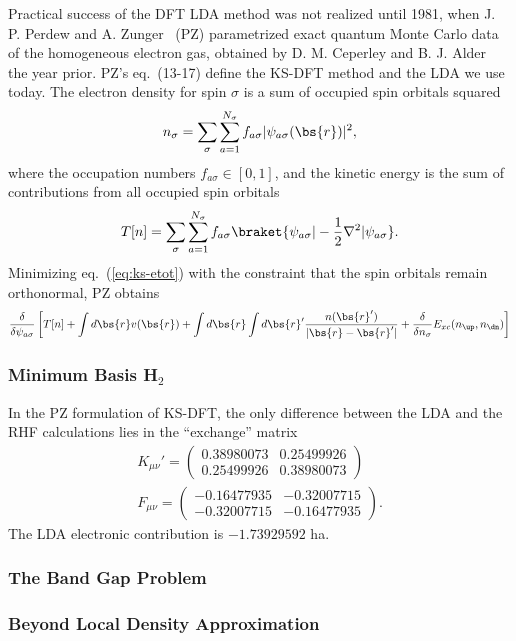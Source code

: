 Practical success of the DFT LDA method was not realized until 1981, when J. P. Perdew and A. Zunger~\cite{Perdew1981} (PZ) parametrized exact quantum Monte Carlo data of the homogeneous electron gas, obtained by D. M. Ceperley and B. J. Alder~\cite{Ceperley1980} the year prior. PZ's eq.~(13-17) define the KS-DFT method and the LDA we use today. The electron density for spin $\sigma$ is a sum of occupied spin orbitals squared
\begin{align}
n_{\sigma} = \sum\limits_{\sigma}\sum\limits_{a=1}^{N_{\sigma}}
f_{a\sigma} \vert\psi_{a\sigma}(\bs{r})\vert^2,
\end{align}
where the occupation numbers $f_{a\sigma}\in[0, 1]$, and the kinetic energy is the sum of contributions from all occupied spin orbitals
\begin{align}
T[n] = \sum\limits_\sigma\sum\limits_{a=1}^{N_{\sigma}}
f_{a\sigma} \braket{\psi_{a\sigma}|-\frac{1}{2}\nabla^2|\psi_{a\sigma}}.
\end{align}
Minimizing eq.~(\ref{eq:ks-etot}) with the constraint that the spin orbitals remain orthonormal, PZ obtains
\begin{align}
\dfrac{\delta}{\delta\psi_{a\sigma}} \left[
T[n] + \int d\bs{r}v(\bs{r}) + \int d\bs{r}\int d\bs{r}' \dfrac{n(\bs{r}')}{\vert\bs{r}-\bs{r}'\vert} +
\dfrac{\delta}{\delta n_{\sigma}} E_{xc}(n_{\up},n_{\dn})
\right]
\end{align}

\subsubsection{Minimum Basis H$_2$}
In the PZ formulation of KS-DFT, the only difference between the LDA and the RHF calculations lies in the ``exchange'' matrix
\begin{align}
K_{\mu\nu}' = \left(\begin{array}{cc}
0.38980073 & 0.25499926 \\
0.25499926 & 0.38980073
\end{array}\right)\\
F_{\mu\nu} = \left(\begin{array}{cc}
-0.16477935 & -0.32007715 \\
-0.32007715 & -0.16477935
\end{array}\right).\label{eq:h2-lda-fock-r14}
\end{align}
The LDA electronic contribution is $-1.73929592$ ha.

\subsubsection{The Band Gap Problem}

\subsubsection{Beyond Local Density Approximation}
